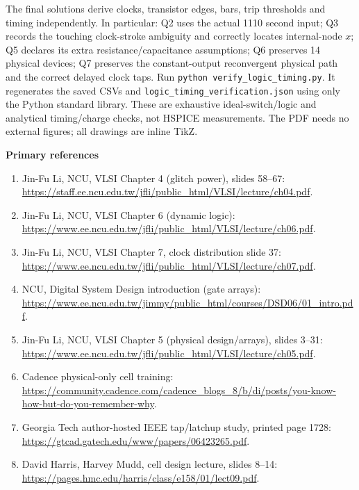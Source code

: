 \documentclass[10pt]{article}
\newcommand{\qheading}[1]{\par\medskip\textbf{#1}\par}
\begin{document}
The final solutions derive clocks, transistor edges, bars, trip thresholds and timing independently. In particular: Q2 uses the actual 1110 second input; Q3 records the touching clock-stroke ambiguity and correctly locates internal-node $x$; Q5 declares its extra resistance/capacitance assumptions; Q6 preserves 14 physical devices; Q7 preserves the constant-output reconvergent physical path and the correct delayed clock taps.
Run \texttt{python verify\_logic\_timing.py}. It regenerates the saved CSVs and \texttt{logic\_timing\_verification.json} using only the Python standard library. These are exhaustive ideal-switch/logic and analytical timing/charge checks, not HSPICE measurements. The PDF needs no external figures; all drawings are inline TikZ.
\qheading{Primary references}
\begin{enumerate}[leftmargin=6mm,itemsep=3pt]
\item Jin-Fu Li, NCU, VLSI Chapter 4 (glitch power), slides 58--67: \url{https://staff.ee.ncu.edu.tw/jfli/public_html/VLSI/lecture/ch04.pdf}.
\item Jin-Fu Li, NCU, VLSI Chapter 6 (dynamic logic): \url{https://www.ee.ncu.edu.tw/jfli/public_html/VLSI/lecture/ch06.pdf}.
\item Jin-Fu Li, NCU, VLSI Chapter 7, clock distribution slide 37: \url{https://www.ee.ncu.edu.tw/jfli/public_html/VLSI/lecture/ch07.pdf}.
\item NCU, Digital System Design introduction (gate arrays): \url{https://www.ee.ncu.edu.tw/jimmy/public_html/courses/DSD06/01_intro.pdf}.
\item Jin-Fu Li, NCU, VLSI Chapter 5 (physical design/arrays), slides 3--31: \url{https://www.ee.ncu.edu.tw/jfli/public_html/VLSI/lecture/ch05.pdf}.
\item Cadence physical-only cell training: \url{https://community.cadence.com/cadence_blogs_8/b/di/posts/you-know-how-but-do-you-remember-why}.
\item Georgia Tech author-hosted IEEE tap/latchup study, printed page 1728: \url{https://gtcad.gatech.edu/www/papers/06423265.pdf}.
\item David Harris, Harvey Mudd, cell design lecture, slides 8--14: \url{https://pages.hmc.edu/harris/class/e158/01/lect09.pdf}.
\end{enumerate}
\end{document}
